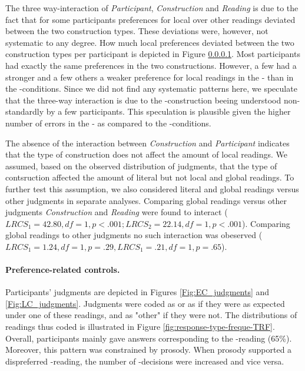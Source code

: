 \documentclass[fleqn,reqno,10pt,draft]{article}
\newcommand{\as}{\acro{as}}
\renewcommand{\es}{\acro{es}}
\newcommand{\lc}{\acro{lc}}
\newcommand{\ec}{\acro{ec}}
\begin{document}
The three way-interaction of {\it Participant}, {\it Construction} and
{\it Reading} is due to the fact that for some participants
preferences for local over other readings deviated between the two
construction types. These deviations were, however, not systematic to
any degree. How much local preferences deviated between the two
construction types per participant is depicted in Figure
\ref{}. Most
participants had exactly the same preferences in the two
constructions. However, a few had a stronger and a few others a weaker
preference for local readings in the \es- than in the
\as-conditions. Since we did not find any systematic patterns
here, we speculate that the three-way interaction is due to the
\es-construction beeing understood non-standardly by a
few participants. This speculation is plausible given the higher
number of errors in the \es- as compared to the \as-conditions.

The absence of the interaction between {\it Construction} and {\it
  Participant} indicates that the type of construction does not affect
the amount of local readings. We assumed, based on the observed
distribution of judgments, that the type of contsruction affected the
amount of literal but not local and global readings. To further test
this assumption, we also considered literal and global readings versus
other judgments in separate analyses. Comparing global readings versus
other judgments {\it Construction} and {\it Reading} were found to
interact ($LRCS_1=42.80, df= 1, p<.001; LRCS_2=22.14, df= 1,
p<.001$). Comparing global readings to other judgments no such
interaction was obeserved ($LRCS_1=1.24, df= 1, p=.29, LRCS_1=.21, df=
1, p=.65$).


\paragraph{Preference-related controls.} Participants' judgments are
depicted in Figures \ref{Fig:EC_judgments} and
\ref{Fig:LC_judgments}. Judgments were coded as \ec or as \lc if they
were as expected under one of these readings, and as "other" if they
were not. The distributions of readings thus coded is illustrated in
Figure \ref{fig:response-type-freque-TRF}.  Overall, participants
mainly gave answers corresponding to the \lc-reading (65\%).
Moreover, this pattern was constrained by prosody. When prosody
supported a dispreferred \ec-reading, the number of \ec-decisions were
increased and vice versa.
\end{document}
